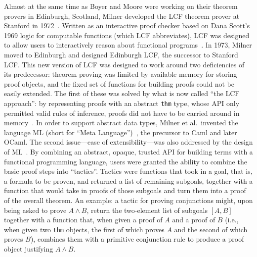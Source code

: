 Almost at the same time as Boyer and Moore were working on their theorem provers in Edinburgh, Scotland, Milner developed the LCF theorem prover at Stanford in 1972~\cite[p.~1]{LCF2000Gordon}.
Written as an interactive proof checker based on Dana Scott's 1969 logic for computable functions (which LCF abbreviates), LCF was designed to allow users to interactively reason about functional programs~\cite[p.~1]{LCF2000Gordon}.
In 1973, Milner moved to Edinburgh and designed Edinburgh LCF, the successor to Stanford LCF.
This new version of LCF was designed to work around two deficiencies of its predecessor: theorem proving was limited by available memory for storing proof objects, and the fixed set of functions for building proofs could not be easily extended.
The first of these was solved by what is now called ``the LCF approach'': by representing proofs with an abstract \texttt{thm} type, whose API only permitted valid rules of inference, proofs did not have to be carried around in memory~\cites[pp.~1--2]{LCF2000Gordon}{harrison2001lcf}.
In order to support abstract data types, Milner et al.~invented the language ML (short for ``Meta Language'')~\cite[p.~2]{LCF2000Gordon}, the precursor to Caml and later OCaml.
The second issue---ease of extensibility---was also addressed by the design of ML~\cite[p.~2]{LCF2000Gordon}.
By combining an abstract, opaque, trusted API for building terms with a functional programming language, users were granted the ability to combine the basic proof steps into ``tactics''.
Tactics were functions that took in a goal, that is, a formula to be proven, and returned a list of remaining subgoals, together with a function that would take in proofs of those subgoals and turn them into a proof of the overall theorem.
An example: a tactic for proving conjunctions might, upon being asked to prove $A \wedge B$, return the two-element list of subgoals $[A, B]$ together with a function that, when given a proof of $A$ and a proof of $B$ (i.e., when given two \texttt{thm} objects, the first of which proves $A$ and the second of which proves $B$), combines them with a primitive conjunction rule to produce a proof object justifying $A \wedge B$.


